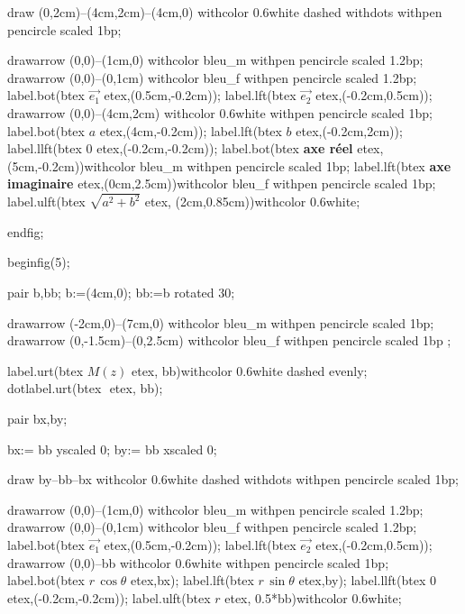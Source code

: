 \documentclass[12pt]{article}
\begin{document}
draw (0,2cm)--(4cm,2cm)--(4cm,0) withcolor 0.6white dashed withdots withpen pencircle scaled 1bp;

drawarrow (0,0)--(1cm,0) withcolor bleu_m withpen pencircle scaled 1.2bp;
drawarrow (0,0)--(0,1cm) withcolor bleu_f withpen pencircle scaled 1.2bp;
label.bot(btex $\overrightarrow{e_1}$ etex,(0.5cm,-0.2cm));
label.lft(btex $\overrightarrow{e_2}$ etex,(-0.2cm,0.5cm));
drawarrow (0,0)--(4cm,2cm) withcolor 0.6white withpen pencircle scaled 1bp;
label.bot(btex $a$ etex,(4cm,-0.2cm));
label.lft(btex $b$ etex,(-0.2cm,2cm));
label.llft(btex $0$ etex,(-0.2cm,-0.2cm));
label.bot(btex \textbf{axe r\'eel} etex,(5cm,-0.2cm))withcolor bleu_m withpen pencircle scaled 1bp;
label.lft(btex \textbf{axe imaginaire} etex,(0cm,2.5cm))withcolor bleu_f withpen pencircle scaled 1bp;
label.ulft(btex $\sqrt{a^2+b^2}$ etex, (2cm,0.85cm))withcolor 0.6white;

endfig;





beginfig(5);

pair b,bb;
b:=(4cm,0);
bb:=b rotated 30;

drawarrow (-2cm,0)--(7cm,0) withcolor bleu_m withpen pencircle scaled 1bp;
drawarrow (0,-1.5cm)--(0,2.5cm)  withcolor bleu_f withpen pencircle scaled 1bp ;

label.urt(btex $M(z)$ etex, bb)withcolor 0.6white dashed evenly;
dotlabel.urt(btex $ $ etex, bb);

pair bx,by; %

bx:= bb yscaled 0;
by:= bb xscaled 0;

draw by--bb--bx withcolor 0.6white dashed withdots withpen pencircle scaled 1bp;

drawarrow (0,0)--(1cm,0) withcolor bleu_m withpen pencircle scaled 1.2bp;
drawarrow (0,0)--(0,1cm) withcolor bleu_f withpen pencircle scaled 1.2bp;
label.bot(btex $\overrightarrow{e_1}$ etex,(0.5cm,-0.2cm));
label.lft(btex $\overrightarrow{e_2}$ etex,(-0.2cm,0.5cm));
drawarrow (0,0)--bb withcolor 0.6white withpen pencircle scaled 1bp;
label.bot(btex $r\,\cos\theta$ etex,bx);
label.lft(btex $r\,\sin\theta$ etex,by);
label.llft(btex $0$ etex,(-0.2cm,-0.2cm));
label.ulft(btex $r$ etex, 0.5*bb)withcolor 0.6white;
\end{document}
